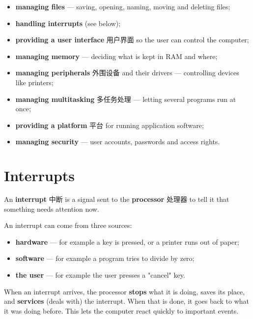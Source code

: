 \documentclass[11pt]{article}
\begin{document}
\begin{itemize}
\item \textbf{managing files} — saving, opening, naming, moving and deleting files;

\item \textbf{handling interrupts} (see below);

\item \textbf{providing a user interface} 用户界面 so the user can control the computer;

\item \textbf{managing memory} — deciding what is kept in RAM and where;

\item \textbf{managing peripherals} 外围设备 and their drivers — controlling devices like printers;

\item \textbf{managing multitasking} 多任务处理 — letting several programs run at once;

\item \textbf{providing a platform} 平台 for running application software;

\item \textbf{managing security} — user accounts, passwords and access rights.

\end{itemize}

\section*{Interrupts}

An \textbf{interrupt} 中断 is a signal sent to the \textbf{processor} 处理器 to tell it that something needs attention now.

An interrupt can come from three sources:

\begin{itemize}
\item \textbf{hardware} — for example a key is pressed, or a printer runs out of paper;

\item \textbf{software} — for example a program tries to divide by zero;

\item \textbf{the user} — for example the user presses a "cancel" key.

\end{itemize}

When an interrupt arrives, the processor \textbf{stops} what it is doing, saves its place, and \textbf{services} (deals with) the interrupt. When that is done, it goes back to what it was doing before. This lets the computer react quickly to important events.
\end{document}
